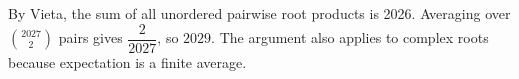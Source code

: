 By Vieta, the sum of all unordered pairwise root products is 2026. Averaging over $\binom{2027}{2}$ pairs gives $\dfrac{2}{2027}$, so $\boxed{2029}$. The argument also applies to complex roots because expectation is a finite average.
